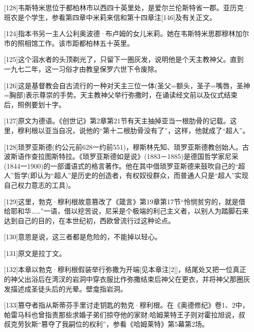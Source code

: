 \documentclass{article}
\begin{document}
[128]韦斯特米思位于都柏林市以西四十英里处，是爱尔兰伦斯特省一郡。亚历克·班农是个学生，参看第四章中米莉来信和第十四章注[146]及有关正文。



[124]指本书另一主人公利奥波德·布卢姆的女儿米莉。她在韦斯特米思郡穆林加尔市的照相馆工作。该市距都柏林五十英里。



[125]这个泅水者的头顶剃光了，只留下一圏灰发，说明他是个天主教神父。直到一九七二年，这一习俗才由教皇保罗六世下令废除。



[126]这是基督教会自古流行的一种对天主三位一体(圣父=额头，圣子=嘴唇，圣神=胸部)表示尊崇的手势。天主教神父举行弥撒时，在诵读经文前以及仪式结束后，照例要划十字。



[127]原文为德语。《创世记》第2章第21节有天主抽掉亚当一根肋骨的记载。这里，穆利根以亚当自况，说他的“第十二根肋骨没有了”，这样，他就成了“超人”。



[128]琐罗亚斯德(约公元前628一约前551)，穆斯林先知、琐罗亚斯德教创始人。古波斯语作查拉图斯特拉。《琐罗亚斯德如是说》(1883－1885)是德国哲学家尼采(1844一1900)的一部谶语式的格言著作。他在其中借琐罗亚斯德来鼓吹自己的“超人”哲学(即认为“超人”是历史的创造者，有权奴役群众，而普通人只是“超人”实现自己权力意志的工具)。



[129]这里，勃克·穆利根故意篡改了《箴言》第19章第17节“怜悯贫穷的，就是借给耶和华……”一语，借以挖苦说，尼采是个极端的利己主义者，以别人为踏脚石来达到自己的目的，在本世纪初，西欧曾流行过这种论点。



[130]意思是说，这三者都是危险的，不能掉以轻心。



[131]原文是拉丁文。



[132]本章以勃克·穆利根假装举行弥撒为开端[见本章注[2]]，结尾处又把一位真正的神父出浴后在湾汊的岩洞中穿衣服比作弥撒结束后神父在更衣，并将神父那圈灰发描述成圣徒头后的光晕。壁龛指岩洞。



[133]篡夺者指从斯蒂芬手里讨走钥匙的勃克·穆利根。在《奥德修纪》卷1、2中，帕雷马科也曾指责那些求婚子弟们掠夺他的家财;哈姆莱特王子则对霍拉旭说，叔叔克劳狄斯“篡夺了我嗣位的权利”，参看《哈姆莱特》第5幕第2场。
\end{document}
